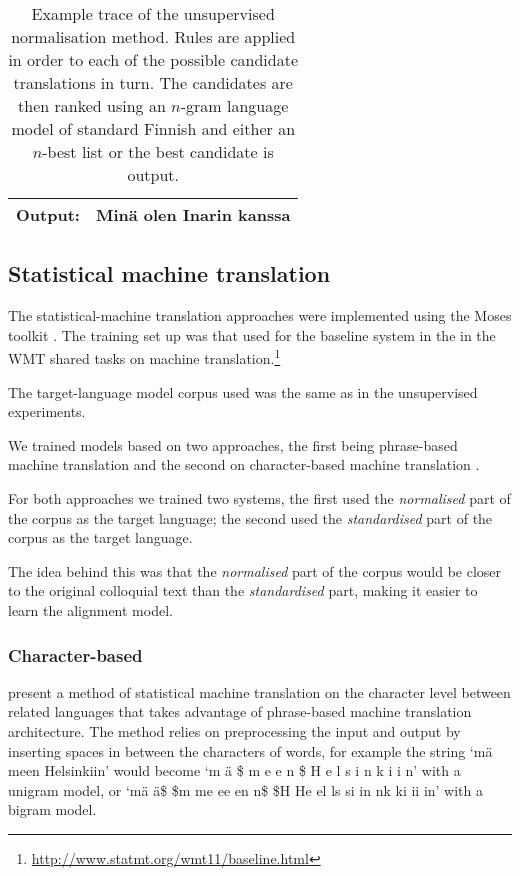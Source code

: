 \documentclass[11pt]{article}
\begin{document}
\begin{table*}
\begin{tabular}{|l|r|l|l|}
    \hline
    \textbf{Output:} & \multicolumn{3}{l|}{Min\"{a} olen Inarin kanssa} \\
    \hline
  \end{tabular}
  \caption{Example trace of the unsupervised normalisation method. Rules are applied in order to each of 
     the possible candidate translations in turn. The candidates are then ranked using an $n$-gram language model 
     of standard Finnish and either an $n$-best list
     or the best candidate is output.}
  \label{table:unsup-trace}
\end{table*}

\subsection{Statistical machine translation}


The statistical-machine translation approaches were implemented using the 
Moses toolkit \cite{koehn2007}. The training set up was that used for
the baseline system in the  in the WMT shared tasks
on machine translation.\footnote{\url{http://www.statmt.org/wmt11/baseline.html}}

The target-language model corpus used was the same as in the unsupervised experiments. 

We trained models based on two approaches, the first being phrase-based machine translation
\cite{zens2002} and the second on character-based machine translation \cite{nakov2012,TiedemannEAMT2009}.

For both approaches we trained two systems, the first used the \emph{normalised}
part of the corpus as the target language; the second used the \emph{standardised} 
part of the corpus as the target language.

The idea behind this was that the \emph{normalised} part of the corpus would be closer
to the original colloquial text than the \emph{standardised} part, making it easier
to learn the alignment model. 

\subsubsection{Character-based}

 present a method of statistical machine translation on the character level between related languages that takes advantage of phrase-based machine translation architecture. The method relies on preprocessing the input and output by inserting spaces in between the characters of words, for example the string `m\"{a} meen Helsinkiin' would become `m \"{a} \$ m e e n \$ H e l s i n k i i n' with a unigram model, or `m\"{a} \"{a}\$ \$m me ee en n\$ \$H He el ls si in nk ki ii in' with a bigram model.
\end{document}
